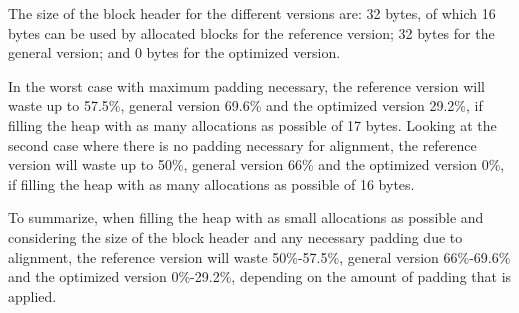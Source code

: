 The size of the block header for the different versions are: 32 bytes, of which 16 bytes can be used by allocated blocks for the reference version; 32 bytes for the general version; and 0 bytes for the optimized version. 

In the worst case with maximum padding necessary, the reference version will waste up to 57.5\%, general version 69.6\% and the optimized version 29.2\%, if filling the heap with as many allocations as possible of 17 bytes. Looking at the second case where there is no padding necessary for alignment, the reference version will waste up to 50\%, general version 66\% and the optimized version 0\%, if filling the heap with as many allocations as possible of 16 bytes.

To summarize, when filling the heap with as small allocations as possible and considering the size of the block header and any necessary padding due to alignment, the reference version will waste 50\%-57.5\%, general version 66\%-69.6\% and the optimized version 0\%-29.2\%, depending on the amount of padding that is applied.







